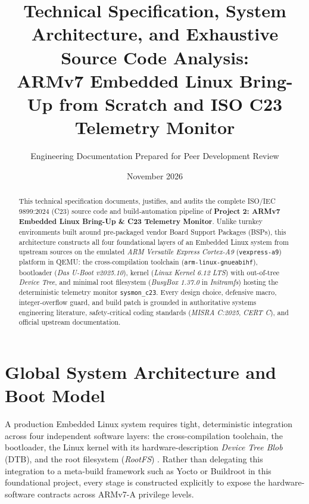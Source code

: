 \documentclass[11pt,a4paper]{article}
\title{\vspace{-1.2cm}\textbf{\color{primary}Technical Specification, System Architecture, and Exhaustive Source Code Analysis:\\
ARMv7 Embedded Linux Bring-Up from Scratch and ISO C23 Telemetry Monitor}}
\author{Engineering Documentation Prepared for Peer Development Review}
\date{November 2026}
\begin{document}
\maketitle
\thispagestyle{empty}

\begin{abstract}
This technical specification documents, justifies, and audits the complete ISO/IEC 9899:2024 (C23) source code and build-automation pipeline of \textbf{Project 2: ARMv7 Embedded Linux Bring-Up \& C23 Telemetry Monitor}. Unlike turnkey environments built around pre-packaged vendor Board Support Packages (BSPs), this architecture constructs all four foundational layers of an Embedded Linux system from upstream sources on the emulated \emph{ARM Versatile Express Cortex-A9} (\texttt{vexpress-a9}) platform in QEMU: the cross-compilation toolchain (\texttt{arm-linux-gnueabihf}), bootloader (\emph{Das U-Boot v2025.10}), kernel (\emph{Linux Kernel 6.12 LTS}) with out-of-tree \emph{Device Tree}, and minimal root filesystem (\emph{BusyBox 1.37.0} in \emph{Initramfs}) hosting the deterministic telemetry monitor \texttt{sysmon\_c23}. Every design choice, defensive macro, integer-overflow guard, and build patch is grounded in authoritative systems engineering literature, safety-critical coding standards (\emph{MISRA C:2025}, \emph{CERT C}), and official upstream documentation.
\end{abstract}

\tableofcontents
\newpage

\section{Global System Architecture and Boot Model}

A production Embedded Linux system requires tight, deterministic integration across four independent software layers: the cross-compilation toolchain, the bootloader, the Linux kernel with its hardware-description \emph{Device Tree Blob} (DTB), and the root filesystem (\emph{RootFS}) \cite{simmonds2017,billoo2022}. Rather than delegating this integration to a meta-build framework such as Yocto or Buildroot in this foundational project, every stage is constructed explicitly to expose the hardware-software contracts across ARMv7-A privilege levels.
\end{document}
